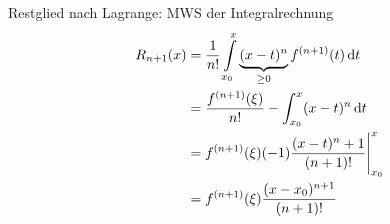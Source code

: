 \begin{note}
	Restglied nach Lagrange: MWS der Integralrechnung
	\begin{align*}
		R_{n+1} (x) &= \frac{1}{n!} \int\limits_{x_0}^x \underbrace{(x-t)^n}_{\geq 0} f^{(n+1)} (t) \,\mathrm d t \\
		&= \frac{f^{(n+1)}(\xi)}{n!} - \int_{x_0}^x (x-t)^n \,\mathrm d t \\
		&= f^{(n+1)} (\xi) (-1) \frac{(x-t)^n+1}{(n+1)!}\Bigg|_{x_0}^x \\
		&= f^{(n+1)} (\xi) \frac{(x-x_0)^{n+1}}{(n+1)!}
	\end{align*}
\end{note}






















